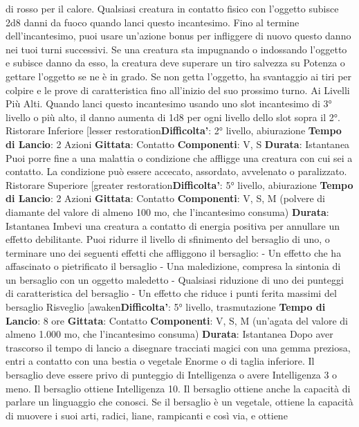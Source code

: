 \begin{multicols}{2}
di rosso per il calore. Qualsiasi creatura in contatto
fisico con l’oggetto subisce 2d8 danni da fuoco quando
lanci questo incantesimo. Fino al termine
dell’incantesimo, puoi usare un’azione bonus per
infliggere di nuovo questo danno nei tuoi turni
successivi.
Se una creatura sta impugnando o indossando l’oggetto
e subisce danno da esso, la creatura deve superare un
tiro salvezza su Potenza o gettare l’oggetto se ne è
in grado. Se non getta l’oggetto, ha svantaggio ai tiri per
colpire e le prove di caratteristica fino all’inizio del suo
prossimo turno.
Ai Livelli Più Alti. Quando lanci questo incantesimo
usando uno slot incantesimo di 3° livello o più alto, il
danno aumenta di 1d8 per ogni livello dello slot sopra il
2°.
Ristorare Inferiore
[lesser restoration\textbf{Difficolta'}:
2° livello, abiurazione
\textbf{Tempo di Lancio}: 2 Azioni
\textbf{Gittata}: Contatto
\textbf{Componenti}: V, S
\textbf{Durata}: Istantanea
Puoi porre fine a una malattia o condizione che affligge
una creatura con cui sei a contatto. La condizione può
essere accecato, assordato, avvelenato o paralizzato.
Ristorare Superiore
[greater restoration\textbf{Difficolta'}:
5° livello, abiurazione
\textbf{Tempo di Lancio}: 2 Azioni
\textbf{Gittata}: Contatto
\textbf{Componenti}: V, S, M (polvere di diamante del valore di
almeno 100 mo, che l’incantesimo consuma)
\textbf{Durata}: Istantanea
Imbevi una creatura a contatto di energia positiva per
annullare un effetto debilitante. Puoi ridurre il livello di
sfinimento del bersaglio di uno, o terminare uno dei
seguenti effetti che affliggono il bersaglio:
- Un effetto che ha affascinato o pietrificato il
bersaglio
- Una maledizione, compresa la sintonia di un
bersaglio con un oggetto maledetto
- Qualsiasi riduzione di uno dei punteggi di
caratteristica del bersaglio
- Un effetto che riduce i punti ferita massimi del
bersaglio
Risveglio
[awaken\textbf{Difficolta'}:
5° livello, trasmutazione
\textbf{Tempo di Lancio}: 8 ore
\textbf{Gittata}: Contatto
\textbf{Componenti}: V, S, M (un’agata del valore di almeno
1.000 mo, che l’incantesimo consuma)
\textbf{Durata}: Istantanea
Dopo aver trascorso il tempo di lancio a disegnare
tracciati magici con una gemma preziosa, entri a
contatto con una bestia o vegetale Enorme o di taglia
inferiore. Il bersaglio deve essere privo di punteggio di
Intelligenza o avere Intelligenza 3 o meno. Il bersaglio
ottiene Intelligenza 10. Il bersaglio ottiene anche la
capacità di parlare un linguaggio che conosci. Se il
bersaglio è un vegetale, ottiene la capacità di muovere i
suoi arti, radici, liane, rampicanti e così via, e ottiene

\end{multicols}
